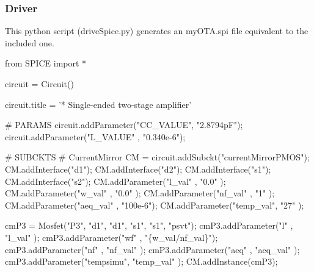 \hypertarget{spice_spiceDrivePython}{}\subsubsection{Driver}\label{spice_spiceDrivePython}
This python script ({\ttfamily drive\+Spice.\+py}) generates an my\+O\+T\+A.\+spi file equivalent to the included one. 
\begin{DoxyCodeInclude}
\textcolor{keyword}{from} SPICE \textcolor{keyword}{import} *

circuit = Circuit()

circuit.title = \textcolor{stringliteral}{'* Single-ended two-stage amplifier'}

\textcolor{comment}{# PARAMS}
circuit.addParameter(\textcolor{stringliteral}{"CC\_VALUE"}, \textcolor{stringliteral}{"2.8794pF"});
circuit.addParameter(\textcolor{stringliteral}{"L\_VALUE"} , \textcolor{stringliteral}{"0.340e-6"});

\textcolor{comment}{# SUBCKTS}
\textcolor{comment}{# CurrentMirror}
CM = circuit.addSubckt(\textcolor{stringliteral}{"currentMirrorPMOS"});
CM.addInterface(\textcolor{stringliteral}{"d1"});
CM.addInterface(\textcolor{stringliteral}{"d2"});
CM.addInterface(\textcolor{stringliteral}{"s1"});
CM.addInterface(\textcolor{stringliteral}{"s2"});
CM.addParameter(\textcolor{stringliteral}{"l\_val"}   , \textcolor{stringliteral}{"0.0"}   );
CM.addParameter(\textcolor{stringliteral}{"w\_val"}   , \textcolor{stringliteral}{"0.0"}   );
CM.addParameter(\textcolor{stringliteral}{"nf\_val"}  , \textcolor{stringliteral}{"1"}     );
CM.addParameter(\textcolor{stringliteral}{"aeq\_val"} , \textcolor{stringliteral}{"100e-6"});
CM.addParameter(\textcolor{stringliteral}{"temp\_val"}, \textcolor{stringliteral}{"27"}    );

cmP3 = Mosfet(\textcolor{stringliteral}{"P3"}, \textcolor{stringliteral}{"d1"}, \textcolor{stringliteral}{"d1"}, \textcolor{stringliteral}{"s1"}, \textcolor{stringliteral}{"s1"}, \textcolor{stringliteral}{"psvt"});
cmP3.addParameter(\textcolor{stringliteral}{"l"}       , \textcolor{stringliteral}{"l\_val"}         );
cmP3.addParameter(\textcolor{stringliteral}{"wf"}      , \textcolor{stringliteral}{"\{w\_val/nf\_val\}"});
cmP3.addParameter(\textcolor{stringliteral}{"nf"}      , \textcolor{stringliteral}{"nf\_val"}        );
cmP3.addParameter(\textcolor{stringliteral}{"aeq"}     , \textcolor{stringliteral}{"aeq\_val"}       );
cmP3.addParameter(\textcolor{stringliteral}{"tempsimu"}, \textcolor{stringliteral}{"temp\_val"}      );
CM.addInstance(cmP3);


\end{DoxyCodeInclude}
